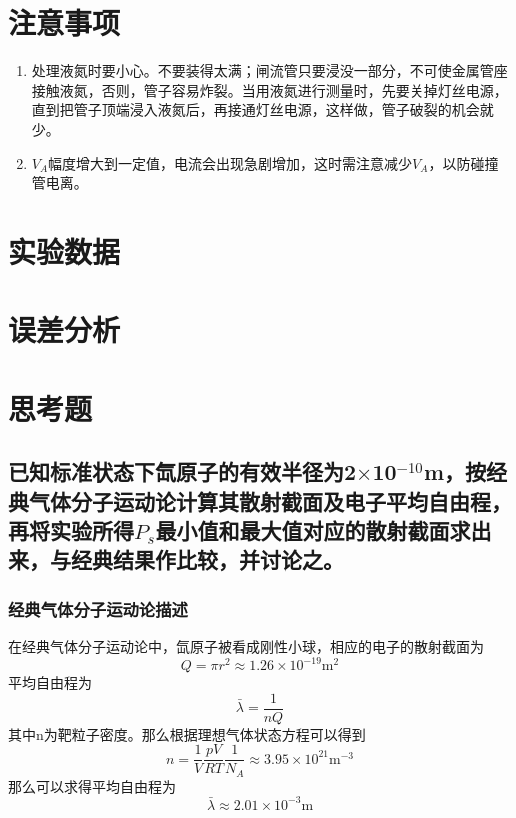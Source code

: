 \documentclass[a4paper]{article}
\begin{document}
\section{注意事项}
\begin{enumerate}
\item 处理液氮时要小心。不要装得太满；闸流管只要浸没一部分，不可使金属管座接触液氮，否则，管子容易炸裂。当用液氮进行测量时，先要关掉灯丝电源，直到把管子顶端浸入液氮后，再接通灯丝电源，这样做，管子破裂的机会就少。
\item $V_A$幅度增大到一定值，电流会出现急剧增加，这时需注意减少$V_A$，以防碰撞管电离。
\end{enumerate}

\newpage
\section{实验数据}

\section{误差分析}

\section{思考题}
\subsection{已知标准状态下氙原子的有效半径为2$\times$10$^{-10}$m，按经典气体分子运动论计算其散射截面及电子平均自由程，再将实验所得$P_s$最小值和最大值对应的散射截面求出来，与经典结果作比较，并讨论之。}
\subsubsection{经典气体分子运动论描述}
在经典气体分子运动论中，氙原子被看成刚性小球，相应的电子的散射截面为
\begin{equation*}
Q = \pi r^2 \approx 1.26\times 10^{-19}\text{m}^2
\end{equation*}
平均自由程为
\begin{equation*}
\bar{\lambda} = \frac{1}{nQ}
\end{equation*}
其中n为靶粒子密度。那么根据理想气体状态方程可以得到
\begin{equation*}
n = \frac{1}{V}\frac{pV}{RT}\frac{1}{N_A} \approx 3.95\times 10^{21}\text{m}^{-3}
\end{equation*}
那么可以求得平均自由程为
\begin{equation*}
\bar{\lambda} \approx 2.01\times 10^{-3}\text{m}
\end{equation*}
\end{document}
